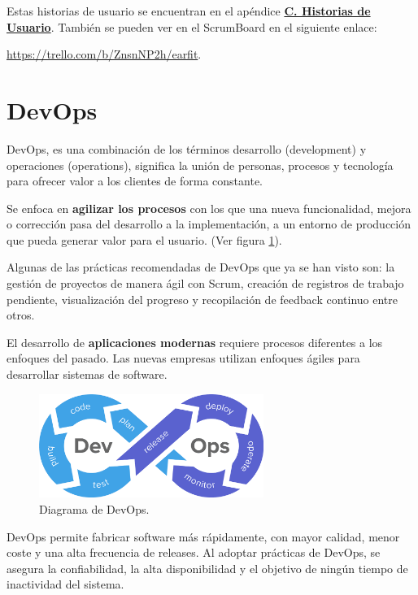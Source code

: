 \documentclass[12pt,twoside,titlepage]{report}
\begin{document}
Estas historias de usuario se encuentran en el apéndice \hyperref[sec:UserStories]{\textbf{C. Historias de Usuario}}. También se pueden ver en el ScrumBoard en el siguiente enlace: 

\url{https://trello.com/b/ZnsnNP2h/earfit}.


\section{DevOps}
\label{sec:DevOps}

DevOps, es una combinación de los términos desarrollo (development) y operaciones (operations), significa la unión de personas, procesos y tecnología para ofrecer valor a los clientes de forma constante.

Se enfoca en \textbf{agilizar los procesos} con los que una nueva funcionalidad, mejora o corrección pasa del desarrollo a la implementación, a un entorno de producción que pueda generar valor para el usuario.
(Ver figura \ref{fig:DevOps}).

Algunas de las prácticas recomendadas de DevOps que ya se han visto son: la gestión de proyectos de manera ágil con Scrum, creación de registros de trabajo pendiente, visualización del progreso y recopilación de feedback continuo entre otros.

El desarrollo de \textbf{aplicaciones modernas} requiere procesos diferentes a los enfoques del pasado. Las nuevas empresas utilizan enfoques ágiles para desarrollar sistemas de software.
\cite{devops1}

\begin{figure}[H]
    \centering
    \includegraphics[width=0.65\textwidth]{DevOps/DevOps}
    \caption{Diagrama de DevOps.}
    \label{fig:DevOps}
\end{figure}

DevOps permite fabricar software más rápidamente, con mayor calidad, menor coste y una alta frecuencia de releases. Al adoptar prácticas de DevOps, se asegura la confiabilidad, la alta disponibilidad y el objetivo de ningún tiempo de inactividad del sistema.
\end{document}
